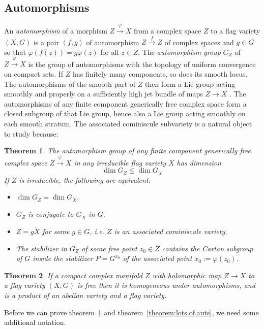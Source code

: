 \documentclass[a4paper,10pt]{amsart}
\newtheorem{theorem}{Theorem}
\theoremstyle{remark}
\begin{document}
\subsection{Automorphisms}\label{subsection:Freedom}
An \emph{automorphism} of a morphism \(Z\xrightarrow{\varphi}X\) from a complex space \(Z\) to a flag variety \((X,G)\) is a pair \((f,g)\) of automorphism \(Z\xrightarrow{f}Z\) of complex spaces and \(g\in G\) so that \(\varphi(f(z))=g\varphi(z)\) for all \(z\in Z\).
The \emph{automorphism group} \(G_Z\) of \(Z\xrightarrow{\varphi}X\) is the group of automorphisms with the topology of uniform convergence on compact sets.
If \(Z\) has finitely many components, so does its smooth locus.
The automorphisms of the smooth part of \(Z\) then form a Lie group acting smoothly and properly on a sufficiently high jet bundle of maps \(Z\to X\) \cite{mckay2023introduction}.
The automorphisms of any finite component generically free complex space form a closed subgroup of that Lie group, hence also a Lie group acting smoothly on each smooth stratum.
The associated cominiscule subvariety is a natural object to study because:
\begin{theorem}\label{theorem:freedom}
The automorphism group of any finite component generically free complex space \(Z\xrightarrow{\varphi}X\) in any irreducible flag variety \(X\) has dimension 
\[
\dim G_Z\le \dim G_{\breve{X}}
\]
If \(Z\) is irreducible, the following are equivalent:
\begin{itemize}
\item
\(\dim G_Z=\dim G_{\breve{X}}\).
\item
\(G_Z\) is conjugate to \(G_{\breve{X}}\) in \(G\).
\item
\(Z=g\breve{X}\) for some \(g\in G\), i.e. \(Z\) is an associated cominiscule variety.
\item
The stabilizer in \(G_Z\) of some free point \(z_0\in Z\) contains the Cartan subgroup of \(G\) inside the stabilizer \(P=G^{x_0}\) of the associated point \(x_0:=\varphi(z_0)\).
\end{itemize}
\end{theorem}
\begin{theorem}\label{theorem:lots.of.auts}
If a compact complex manifold \(Z\) with holomorphic map \(Z\to X\) to a flag variety \((X,G)\) is free then it is homogeneous under automorphisms, and is a product of an abelian variety and a flag variety.
\end{theorem}
Before we can prove theorem~\ref{theorem:freedom} and theorem~\vref{theorem:lots.of.auts}, we need some additional notation.
\end{document}
